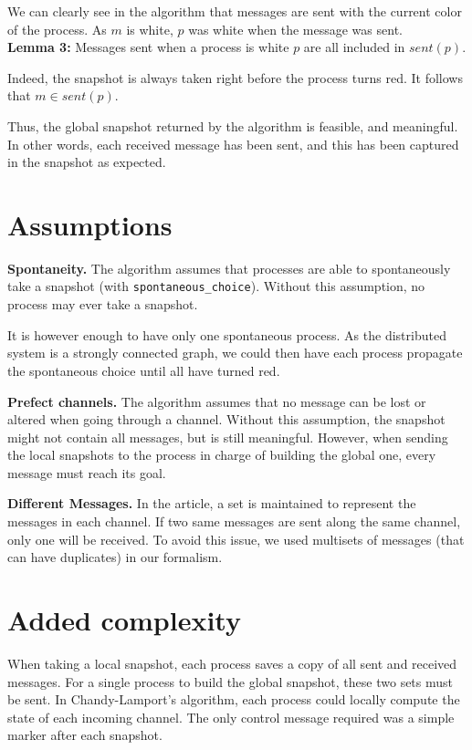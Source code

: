 \documentclass{article}
\begin{document}
We can clearly see in the algorithm that messages are sent with the current color of the process. As $m$ is white, $p$ was white when the message was sent.\\
\textbf{Lemma 3:} Messages sent when a process is white $p$ are all included in $\mathit{sent}(p)$.

Indeed, the snapshot is always taken right before the process turns red.
It follows that $m\in\mathit{sent}(p)$.

Thus, the global snapshot returned by the algorithm is feasible, and meaningful.
In other words, each received message has been sent, and this has been captured in the snapshot as expected.

\section{Assumptions}

\textbf{Spontaneity.} The algorithm assumes that processes are able to spontaneously take a snapshot (with \lstinline{spontaneous_choice}). Without this assumption, no process may ever take a snapshot.

It is however enough to have only one spontaneous process. As the distributed system is a strongly connected graph, we could then have each process propagate the spontaneous choice until all have turned red.

\textbf{Prefect channels.} The algorithm assumes that no message can be lost or altered when going through a channel.
Without this assumption, the snapshot might not contain all messages, but is still meaningful.
However, when sending the local snapshots to the process in charge of building the global one, every message must reach its goal.

\textbf{Different Messages.} In the article, a set is maintained to represent the messages in each channel.
If two same messages are sent along the same channel, only one will be received. To avoid this issue, we used multisets of messages (that can have duplicates) in our formalism.

\section{Added complexity}

When taking a local snapshot, each process saves a copy of all sent and received messages.
For a single process to build the global snapshot, these two sets must be sent.
In Chandy-Lamport's algorithm, each process could locally compute the state of each incoming channel. The only control message required was a simple marker after each snapshot.
\end{document}
